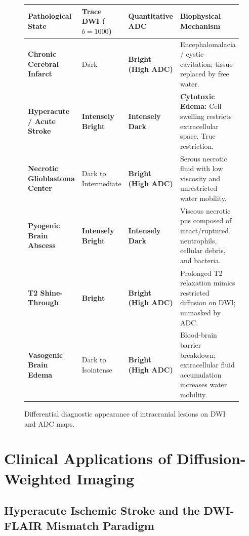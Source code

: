 \documentclass[11pt,a4paper]{article}
\begin{document}
\begin{figure}[htbp]
\centering
\setlength{\tabcolsep}{4pt}
\begin{tabular}{p{3.8cm}p{3.2cm}p{3.2cm}p{4.6cm}}
\toprule
\textbf{Pathological State} & \textbf{Trace DWI ($b=1000$)} & \textbf{Quantitative ADC} & \textbf{Biophysical Mechanism} \\
\midrule
\textbf{Chronic Cerebral Infarct} & Dark & \textbf{Bright (High ADC)} & Encephalomalacia / cystic cavitation; tissue replaced by free water. \\
\addlinespace
\textbf{Hyperacute / Acute Stroke} & \textbf{Intensely Bright} & \textbf{Intensely Dark} & \textbf{Cytotoxic Edema:} Cell swelling restricts extracellular space. True restriction. \\
\addlinespace
\textbf{Necrotic Glioblastoma Center} & Dark to Intermediate & \textbf{Bright (High ADC)} & Serous necrotic fluid with low viscosity and unrestricted water mobility. \\
\addlinespace
\textbf{Pyogenic Brain Abscess} & \textbf{Intensely Bright} & \textbf{Intensely Dark} & Viscous necrotic pus composed of intact/ruptured neutrophils, cellular debris, and bacteria. \\
\addlinespace
\textbf{T2 Shine-Through} & \textbf{Bright} & \textbf{Bright (High ADC)} & Prolonged T2 relaxation mimics restricted diffusion on DWI; unmasked by ADC. \\
\addlinespace
\textbf{Vasogenic Brain Edema} & Dark to Isointense & \textbf{Bright (High ADC)} & Blood-brain barrier breakdown; extracellular fluid accumulation increases water mobility. \\
\bottomrule
\end{tabular}
\caption{Differential diagnostic appearance of intracranial lesions on DWI and ADC maps.}
\label{tab:dwi_adc_ddx}
\end{figure}

\newpage
\section{Clinical Applications of Diffusion-Weighted Imaging}

\subsection{Hyperacute Ischemic Stroke and the DWI-FLAIR Mismatch Paradigm}
\end{document}
